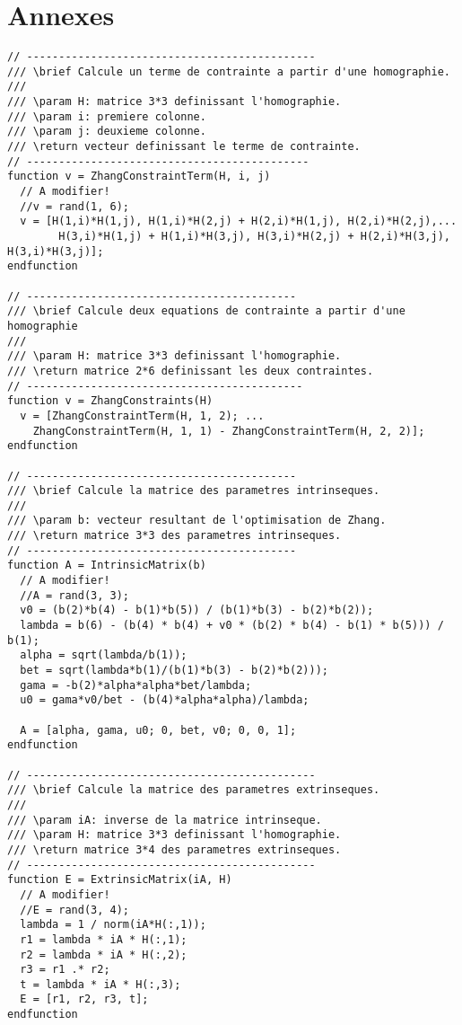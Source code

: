 \documentclass[a4paper,10pt]{article}
\begin{document}
\section{Annexes}
\begin{lstlisting}[caption=Fonctions utilise pour la methode de Zhang]
// ---------------------------------------------
/// \brief Calcule un terme de contrainte a partir d'une homographie.
///
/// \param H: matrice 3*3 definissant l'homographie.
/// \param i: premiere colonne.
/// \param j: deuxieme colonne.
/// \return vecteur definissant le terme de contrainte.
// --------------------------------------------
function v = ZhangConstraintTerm(H, i, j)
  // A modifier!
  //v = rand(1, 6);
  v = [H(1,i)*H(1,j), H(1,i)*H(2,j) + H(2,i)*H(1,j), H(2,i)*H(2,j),...
        H(3,i)*H(1,j) + H(1,i)*H(3,j), H(3,i)*H(2,j) + H(2,i)*H(3,j), H(3,i)*H(3,j)];
endfunction

// ------------------------------------------
/// \brief Calcule deux equations de contrainte a partir d'une homographie
///
/// \param H: matrice 3*3 definissant l'homographie.
/// \return matrice 2*6 definissant les deux contraintes.
// -------------------------------------------
function v = ZhangConstraints(H)
  v = [ZhangConstraintTerm(H, 1, 2); ...
    ZhangConstraintTerm(H, 1, 1) - ZhangConstraintTerm(H, 2, 2)];
endfunction

// ------------------------------------------
/// \brief Calcule la matrice des parametres intrinseques.
///
/// \param b: vecteur resultant de l'optimisation de Zhang.
/// \return matrice 3*3 des parametres intrinseques.
// ------------------------------------------
function A = IntrinsicMatrix(b)
  // A modifier!
  //A = rand(3, 3);
  v0 = (b(2)*b(4) - b(1)*b(5)) / (b(1)*b(3) - b(2)*b(2));
  lambda = b(6) - (b(4) * b(4) + v0 * (b(2) * b(4) - b(1) * b(5))) / b(1);
  alpha = sqrt(lambda/b(1));
  bet = sqrt(lambda*b(1)/(b(1)*b(3) - b(2)*b(2)));
  gama = -b(2)*alpha*alpha*bet/lambda;
  u0 = gama*v0/bet - (b(4)*alpha*alpha)/lambda;
  
  A = [alpha, gama, u0; 0, bet, v0; 0, 0, 1];
endfunction

// ---------------------------------------------
/// \brief Calcule la matrice des parametres extrinseques.
///
/// \param iA: inverse de la matrice intrinseque.
/// \param H: matrice 3*3 definissant l'homographie.
/// \return matrice 3*4 des parametres extrinseques.
// ---------------------------------------------
function E = ExtrinsicMatrix(iA, H)
  // A modifier!
  //E = rand(3, 4);
  lambda = 1 / norm(iA*H(:,1));
  r1 = lambda * iA * H(:,1);
  r2 = lambda * iA * H(:,2);
  r3 = r1 .* r2;
  t = lambda * iA * H(:,3);
  E = [r1, r2, r3, t];
endfunction

\end{lstlisting}
\end{document}
